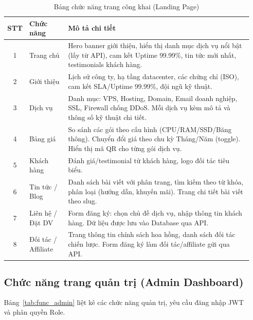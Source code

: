 \begin{table}[htbp]
    \centering
    \caption{Bảng chức năng trang công khai (Landing Page)}
    \label{tab:func_public}
    \begin{tabular}{|c|p{3cm}|p{9cm}|}
        \hline
        \textbf{STT} & \textbf{Chức năng} & \textbf{Mô tả chi tiết} \\
        \hline
        1 & Trang chủ & Hero banner giới thiệu, hiển thị danh mục dịch vụ nổi bật (lấy từ API), cam kết Uptime 99.99\%, tin tức mới nhất, testimonials khách hàng. \\
        \hline
        2 & Giới thiệu & Lịch sử công ty, hạ tầng datacenter, các chứng chỉ (ISO), cam kết SLA/Uptime 99.99\%, đội ngũ kỹ thuật. \\
        \hline
        3 & Dịch vụ & Danh mục: VPS, Hosting, Domain, Email doanh nghiệp, SSL, Firewall chống DDoS. Mỗi dịch vụ kèm mô tả và thông số kỹ thuật chi tiết. \\
        \hline
        4 & Bảng giá & So sánh các gói theo cấu hình (CPU/RAM/SSD/Băng thông). Chuyển đổi giá theo chu kỳ Tháng/Năm (toggle). Hiển thị mã QR cho từng gói dịch vụ. \\
        \hline
        5 & Khách hàng & Đánh giá/testimonial từ khách hàng, logo đối tác tiêu biểu. \\
        \hline
        6 & Tin tức / Blog & Danh sách bài viết với phân trang, tìm kiếm theo từ khóa, phân loại (hướng dẫn, khuyến mãi). Trang chi tiết bài viết theo slug. \\
        \hline
        7 & Liên hệ / Đặt DV & Form đăng ký: chọn chủ đề dịch vụ, nhập thông tin khách hàng. Dữ liệu được lưu vào Database qua API. \\
        \hline
        8 & Đối tác / Affiliate & Trang thông tin chính sách hoa hồng, danh sách đối tác chiến lược. Form đăng ký làm đối tác/affiliate gửi qua API. \\
        \hline
    \end{tabular}
\end{table}

\subsection{Chức năng trang quản trị (Admin Dashboard)}
Bảng~\ref{tab:func_admin} liệt kê các chức năng quản trị, yêu cầu đăng nhập JWT và phân quyền Role.

